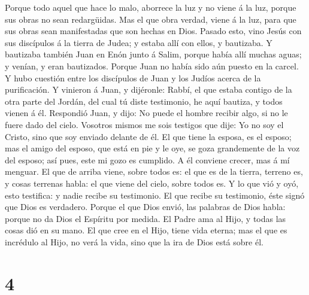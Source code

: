 Porque todo aquel que hace lo malo, aborrece la luz y no viene á la luz,
porque sus obras no sean redargüidas.  Mas el que obra
verdad, viene á la luz, para que sus obras sean manifestadas que son
hechas en Dios.  Pasado esto, vino Jesús con sus
discípulos á la tierra de Judea; y estaba allí con ellos, y bautizaba.
 Y bautizaba también Juan en Enón junto á Salim, porque
había allí muchas aguas; y venían, y eran bautizados. 
Porque Juan no había sido aún puesto en la carcel.  Y
hubo cuestión entre los discípulos de Juan y los Judíos acerca de la
purificación.  Y vinieron á Juan, y dijéronle: Rabbí, el
que estaba contigo de la otra parte del Jordán, del cual tú diste
testimonio, he aquí bautiza, y todos vienen á él. 
Respondió Juan, y dijo: No puede el hombre recibir algo, si no le fuere
dado del cielo.  Vosotros mismos me sois testigos que
dije: Yo no soy el Cristo, sino que soy enviado delante de él.
 El que tiene la esposa, es el esposo; mas el amigo del
esposo, que está en pie y le oye, se goza grandemente de la voz del
esposo; así pues, este mi gozo es cumplido.  A él
conviene crecer, mas á mí menguar.  El que de arriba
viene, sobre todos es: el que es de la tierra, terreno es, y cosas
terrenas habla: el que viene del cielo, sobre todos es. 
Y lo que vió y oyó, esto testifica: y nadie recibe su testimonio.
 El que recibe su testimonio, éste signó que Dios es
verdadero.  Porque el que Dios envió, las palabras de
Dios habla: porque no da Dios el Espíritu por medida.  El
Padre ama al Hijo, y todas las cosas dió en su mano.  El
que cree en el Hijo, tiene vida eterna; mas el que es incrédulo al Hijo,
no verá la vida, sino que la ira de Dios está sobre él.

\hypertarget{section-3}{%
\section{4}\label{section-3}}

